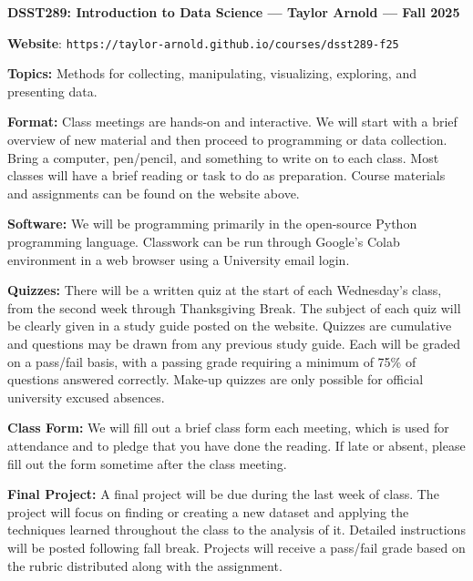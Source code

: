 \documentclass[11pt, a4paper]{article}
\begin{document}
\begin{center}
\textbf{DSST289: Introduction to Data Science --- Taylor Arnold --- Fall 2025}
\end{center}

\vspace{0.5cm}

\textbf{Website}: \texttt{https://taylor-arnold.github.io/courses/dsst289-f25}

\bigskip

\textbf{Topics:}
Methods for collecting, manipulating, visualizing, exploring, and presenting
data.

\bigskip

\textbf{Format:}
Class meetings are hands-on and interactive. We will start with a brief
overview of new material and then proceed to programming or data
collection. Bring a computer, pen/pencil, and something to write on to each class.
Most classes will have a brief reading or task to do as preparation. Course
materials and assignments can be found on the website above. 

\bigskip

\textbf{Software:}
We will be programming primarily in the open-source Python programming language.
Classwork can be run through Google's Colab environment in a web browser using
a University email login. 

\bigskip

\textbf{Quizzes:}
There will be a written quiz at the start of each Wednesday's class, from the
second week through Thanksgiving Break. The subject of each quiz will be clearly
given in a study guide posted on the website. Quizzes are cumulative and 
questions may be drawn from any previous study guide. Each will be graded on
a pass/fail basis, with a passing grade requiring a minimum of 75\% of
questions answered correctly. Make-up quizzes are only possible for official
university excused absences.

\bigskip

\textbf{Class Form:}
We will fill out a brief class form each meeting, which is used for attendance
and to pledge that you have done the reading. If late or absent, please fill out
the form sometime after the class meeting. 

\bigskip

\textbf{Final Project:}
A final project will be due during the last week of class. The project will
focus on finding or creating a new dataset and applying the techniques learned
throughout the class to the analysis of it. Detailed instructions will
be posted following fall break. Projects will receive a pass/fail grade based on
the rubric distributed along with the assignment.
\end{document}
